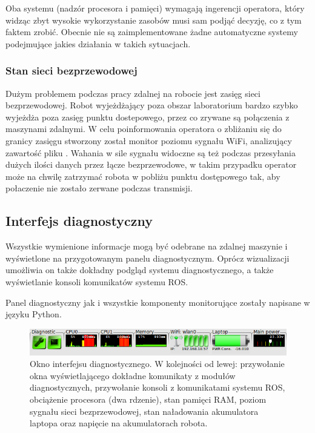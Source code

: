 Oba systemu (nadzór procesora i pamięci) wymagają ingerencji operatora, który
widząc zbyt wysokie wykorzystanie zasobów musi sam podjąć decyzję, co z tym
faktem zrobić. Obecnie nie są zaimplementowane żadne automatyczne systemy
podejmujące jakies działania w takich sytuacjach.

\subsubsection{Stan sieci bezprzewodowej}

Dużym problemem podczas pracy zdalnej na robocie jest zasięg sieci
bezprzewodowej. Robot wyjeżdżający poza obszar laboratorium bardzo szybko
wyjeżdża poza zasięg punktu dostepowego, przez co zrywane są połączenia z
maszynami zdalnymi. W celu poinformowania operatora o zbliżaniu się do granicy
zasięgu stworzony został monitor poziomu sygnału WiFi, analizujący zawartość
pliku . Wahania w sile sygnału widoczne są też podczas
przesyłania dużych ilości danych przez łącze bezprzewodowe, w takim przypadku
operator może na chwilę zatrzymać robota w pobliżu punktu dostępowego tak, aby
połaczenie nie zostało zerwane podczas transmisji. 

\subsection{Interfejs diagnostyczny}

Wszystkie wymienione informacje mogą być odebrane na zdalnej maszynie i
wyświetlone na przygotowanym panelu diagnostycznym. Oprócz wizualizacji
umożliwia on także dokładny podgląd systemu diagnostycznego, a także
wyświetlanie konsoli komunikatów systemu ROS. 

Panel diagnostyczny jak i wszystkie komponenty monitorujące zostały napisane w
języku Python.

\begin{figure}[htb!]
\centering
\includegraphics[width=13cm]{../../Common/img/ros/elektron_dashboard}
\caption[Okno interfejsu diagnostycznego]{Okno interfejsu diagnostycznego. W
kolejności od lewej: przywołanie okna wyświetlającego dokładne komunikaty z modułów diagnostycznych, przywołanie
konsoli z komunikatami systemu ROS, obciążenie procesora (dwa rdzenie), stan
pamięci RAM, poziom sygnału sieci bezprzewodowej, stan naładowania akumulatora
laptopa oraz napięcie na akumulatorach robota.}
\label{fig:elektron_dashboard}
\end{figure}
